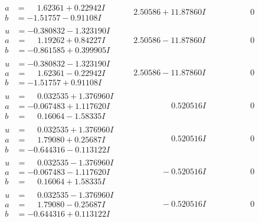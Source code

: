 \documentclass[1p]{elsarticle_modified}
\theoremstyle{definition}
\begin{document}
$$\begin{array}{c|c|c}
\begin{aligned}
a &= \phantom{-}1.62361 + 0.22942 I \\
b &= -1.51757 - 0.91108 I\end{aligned}
 & \phantom{-}2.50586 + 11.87860 I & \phantom{-0.000000 } 0 \\ \hline\begin{aligned}
u &= -0.380832 - 1.323190 I \\
a &= \phantom{-}1.19262 + 0.84227 I \\
b &= -0.861585 + 0.399905 I\end{aligned}
 & \phantom{-}2.50586 - 11.87860 I & \phantom{-0.000000 } 0 \\ \hline\begin{aligned}
u &= -0.380832 - 1.323190 I \\
a &= \phantom{-}1.62361 - 0.22942 I \\
b &= -1.51757 + 0.91108 I\end{aligned}
 & \phantom{-}2.50586 - 11.87860 I & \phantom{-0.000000 } 0 \\ \hline\begin{aligned}
u &= \phantom{-}0.032535 + 1.376960 I \\
a &= -0.067483 + 1.117620 I \\
b &= \phantom{-}0.16064 - 1.58335 I\end{aligned}
 & \phantom{-0.000000 -}0.520516 I & \phantom{-0.000000 } 0 \\ \hline\begin{aligned}
u &= \phantom{-}0.032535 + 1.376960 I \\
a &= \phantom{-}1.79080 + 0.25687 I \\
b &= -0.644316 - 0.113122 I\end{aligned}
 & \phantom{-0.000000 -}0.520516 I & \phantom{-0.000000 } 0 \\ \hline\begin{aligned}
u &= \phantom{-}0.032535 - 1.376960 I \\
a &= -0.067483 - 1.117620 I \\
b &= \phantom{-}0.16064 + 1.58335 I\end{aligned}
 & \phantom{-0.000000 } -0.520516 I & \phantom{-0.000000 } 0 \\ \hline\begin{aligned}
u &= \phantom{-}0.032535 - 1.376960 I \\
a &= \phantom{-}1.79080 - 0.25687 I \\
b &= -0.644316 + 0.113122 I\end{aligned}
 & \phantom{-0.000000 } -0.520516 I & \phantom{-0.000000 } 0\\

\end{array}$$
\end{document}
